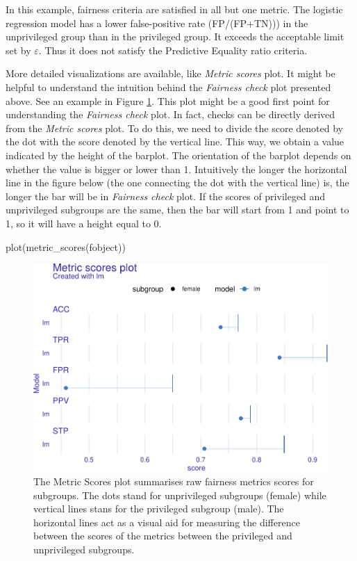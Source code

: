 In this example, fairness criteria are satisfied in all but one metric.
The logistic regression model has a lower false-positive rate
(FP/(FP+TN))) in the unprivileged group than in the privileged group. It
exceeds the acceptable limit set by \(\varepsilon\). Thus it does not
satisfy the Predictive Equality ratio criteria.

More detailed visualizations are available, like \emph{Metric scores}
plot. It might be helpful to understand the intuition behind the
\emph{Fairness check} plot presented above. See an example in Figure
\ref{fig:fairness-plot-2}. This plot might be a good first point for
understanding the \emph{Fairness check} plot. In fact, checks can be
directly derived from the \emph{Metric scores} plot. To do this, we need
to divide the score denoted by the dot with the score denoted by the
vertical line. This way, we obtain a value indicated by the height of
the barplot. The orientation of the barplot depends on whether the value
is bigger or lower than 1. Intuitively the longer the horizontal line in
the figure below (the one connecting the dot with the vertical line) is,
the longer the bar will be in \emph{Fairness check} plot. If the scores
of privileged and unprivileged subgroups are the same, then the bar will
start from 1 and point to 1, so it will have a height equal to 0.

\begin{Schunk}
\begin{Sinput}
plot(metric_scores(fobject))
\end{Sinput}
\begin{figure}

{\centering \includegraphics[width=0.75\linewidth]{RJ-2022-019_files/figure-latex/fairness-plot-2-1} 

}

\caption[The Metric Scores plot summarises raw fairness metrics scores for subgroups]{The Metric Scores plot summarises raw fairness metrics scores for subgroups. The dots stand for unprivileged subgroups (female) while vertical lines stans for the privileged subgroup (male). The horizontal lines act as a visual aid for measuring the difference between the scores of the metrics between the privileged and unprivileged subgroups.}\label{fig:fairness-plot-2}
\end{figure}
\end{Schunk}

